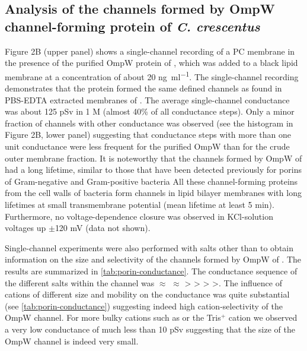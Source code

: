 \subsection{Analysis of the channels formed by OmpW channel-forming protein of \textit{C. crescentus}}

Figure 2B (upper panel) shows a single-channel recording of a \ac{PC} membrane in the presence of the purified OmpW protein of \caulobacter, which was added to a black lipid membrane at a concentration of about 20 \si{\nano\gram\per\milli\litre}. The single-channel recording demonstrates that the protein formed the same defined channels as found in \ac{PBS}-\ac{EDTA} extracted membranes of \caulobacter. The average single-channel conductance was about 125 \si{\pico\sievert} in 1 M  (almost 40\% of all conductance steps). Only a minor fraction of channels with other conductance was observed (see the histogram in Figure 2B, lower panel) suggesting that conductance steps with more than one unit conductance were less frequent for the purified OmpW than for the crude outer membrane fraction. It is noteworthy that the channels formed by OmpW of \caulobacter had a long lifetime, similar to those that have been detected previously for porins of Gram-negative and Gram-positive bacteria All these channel-forming proteins from the cell walls of bacteria form channels in lipid bilayer membranes with long lifetimes at small transmembrane potential (mean lifetime at least 5 min). Furthermore, no voltage-dependence closure was observed in KCl-solution voltages up $\pm$120 mV (data not shown). 

Single-channel experiments were also performed with salts other than  to obtain information on the size and selectivity of the channels formed by OmpW of \caulobacter. The results are summarized in \cref{tab:porin-conductance}. The conductance sequence of the different salts within the channel was  $\approx$  $\approx$  \textgreater {} \textgreater {} \textgreater {} \textgreater {}. The influence of cations of different size and mobility on the conductance was quite substantial (see \cref{tab:porin-conductance}) suggesting indeed high cation-selectivity of the OmpW channel. For more bulky cations such as  or the Tris$^+$ cation we observed a very low conductance of much less than 10 \si{\pico\sievert} suggesting that the size of the OmpW channel is indeed very small. 


